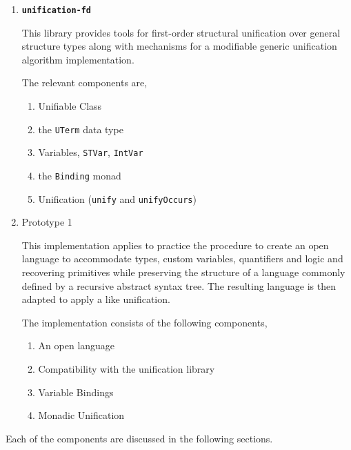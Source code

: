 \documentclass[thesis-solanki.tex]{subfiles}
\providecommand\codeLibrary[1]{\texttt{\bfseries #1}}
\begin{document}
\begin{enumerate}
\item \codeLibrary{unification-fd} \cite{unification-fd-lib}

This library provides tools for first-order structural unification over general structure types along with mechanisms for a modifiable
generic unification algorithm implementation.

The relevant components are,
\begin{enumerate}
\item Unifiable Class

\item the \Verb!UTerm! data type

\item Variables,
  \Verb!STVar!, \Verb!IntVar!

\item the \Verb!Binding! monad

\item Unification (\Verb!unify! and \Verb!unifyOccurs!)
\end{enumerate}

\item Prototype 1

  This implementation applies to practice the procedure to create an open language to accommodate types,
  custom variables, quantifiers and logic and recovering primitives while preserving the structure of a
  language commonly defined by a recursive abstract syntax tree.
  The resulting language is then adapted to apply a  like unification.

The implementation consists of the following components,
\begin{enumerate}
\item An open language

\item Compatibility with the unification library \cite{unification-fd-lib}

\item Variable Bindings

\item Monadic Unification

\end{enumerate}
\end{enumerate}

Each of the components are discussed in the following sections.
\end{document}
